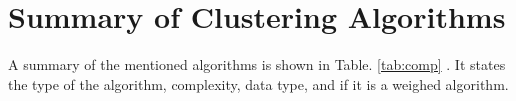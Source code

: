 \documentclass[../report.tex]{subfiles}
\begin{document}






\section{Summary of Clustering Algorithms}
A summary of the mentioned algorithms is shown in Table. \ref{tab:comp}
. It states the type of the algorithm, complexity, data type, and if it is a weighed algorithm.
\end{document}
